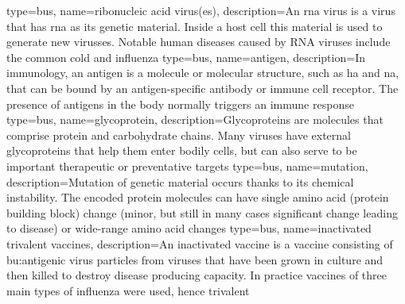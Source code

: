 {
    type=bus,
    name=ribonucleic acid virus(es),
    description={An \acrshort{rna} virus is a virus that has \acrshort{rna} as
    its genetic material. Inside a host cell this material is used to generate
    new virusses. Notable human diseases caused by RNA viruses include the
    common cold and influenza}
}
{
    type=bus,
    name=antigen,
    description={In immunology, an antigen is a molecule or molecular
    structure, such as \acrshort{ha} and \acrshort{na}, that can be bound by an
    antigen-specific antibody or immune cell receptor.  The presence of
    antigens in the body normally triggers an immune response
    }
}
{
    type=bus,
    name=glycoprotein,
    description={Glycoproteins are molecules that comprise protein and
    carbohydrate chains. Many viruses have external glycoproteins that
    help them enter bodily cells, but can also serve to be important
    therapeutic or preventative targets}
}
{
    type=bus,
    name=mutation,
    description={Mutation of genetic material occurs thanks to its chemical
    instability. The encoded protein molecules can have single amino acid
    (protein building block) change (minor, but still in many cases significant
    change leading to disease) or wide-range amino acid changes}
}
{
    type=bus,
    name=inactivated trivalent vaccines,
    description={An inactivated vaccine is a vaccine consisting of
    \gls{bu:antigen}ic virus particles from viruses that have been grown in
    culture and then killed to destroy disease producing capacity. In practice
    vaccines of three main types of influenza were used, hence trivalent}
}
